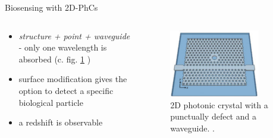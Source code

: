 \begin{frame}{Biosensing with 2D-PhCs}

  \begin{columns}

    \begin{column}{0.49\textwidth}
    \begin{itemize}
      \setlength\itemsep{1.2em}
      \item{\emph{structure + point + waveguide} - only one wavelength is absorbed (c. fig. \ref{fig: 2d_photonic_crystal} )}
      \item{ surface modification gives the option to detect a specific biological particle}
      \item { a redshift is observable}
    \end{itemize}
    \end{column}

    \begin{column}{0.49\textwidth}
    \begin{figure}
      \centering
      \includegraphics[width=0.8\textwidth]{./bilder/2dphc_waveguide_point_defect.png}
      \caption{2D photonic crystal with a punctually defect and a waveguide. \cite{nano}.}
      \label{fig: 2d_photonic_crystal}
    \end{figure}
  \end{column}

  \end{columns}

\end{frame}

